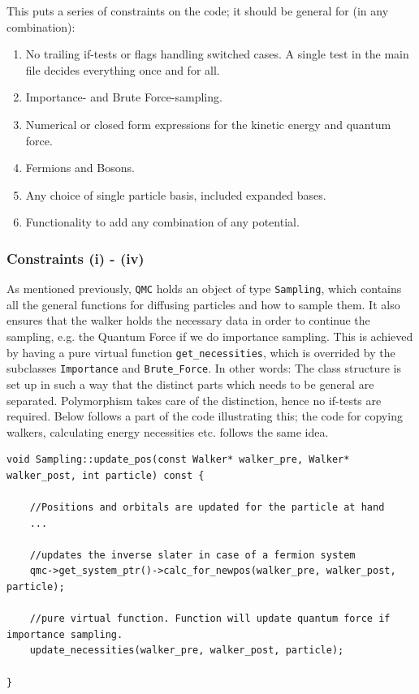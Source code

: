 This puts a series of constraints on the code; it should be general for (in any combination):

\begin{enumerate}[label=(\roman{*}), ref=(\roman{*})]
\item No trailing if-tests or flags handling switched cases. A single test in the main file decides everything once and for all. 
\item Importance- and Brute Force-sampling.
\item Numerical or closed form expressions for the kinetic energy and quantum force.
\item Fermions and Bosons.
\item Any choice of single particle basis, included expanded bases.
\item Functionality to add any combination of any potential.

\end{enumerate}


\subsubsection{Constraints (i) - (iv)}

As mentioned previously, \verb+QMC+ holds an object of type \verb+Sampling+, which contains all the general functions for diffusing particles and how to sample them. It also ensures that the walker holds the necessary data in order to continue the sampling, e.g. the Quantum Force if we do importance sampling. This is achieved by having a pure virtual function \verb+get_necessities+, which is overrided by the subclasses \verb+Importance+ and \verb+Brute_Force+. In other words: The class structure is set up in such a way that the distinct parts which needs to be general are separated. Polymorphism takes care of the distinction, hence no if-tests are required. Below follows a part of the code illustrating this; the code for copying walkers, calculating energy necessities etc. follows the same idea.

\vspace{0.5cm}
\begin{lstlisting}
void Sampling::update_pos(const Walker* walker_pre, Walker* walker_post, int particle) const {

    //Positions and orbitals are updated for the particle at hand
    ...

    //updates the inverse slater in case of a fermion system
    qmc->get_system_ptr()->calc_for_newpos(walker_pre, walker_post, particle);

    //pure virtual function. Function will update quantum force if importance sampling.
    update_necessities(walker_pre, walker_post, particle);

}
\end{lstlisting}

